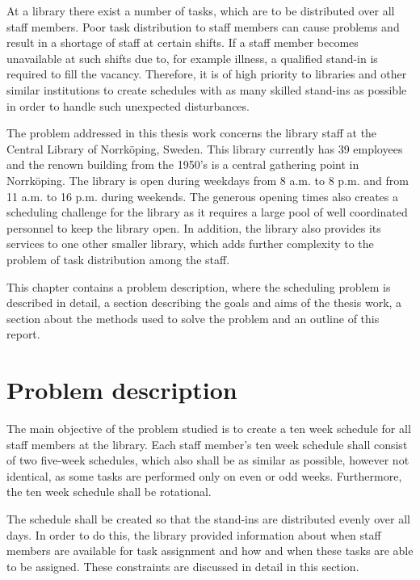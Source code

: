 
At a library there exist a number of tasks, which are to be distributed over all staff members. Poor task distribution to staff members can cause problems and result in a shortage of staff at certain shifts. If a staff member becomes unavailable at such shifts due to, for example illness, a qualified stand-in is required to fill the vacancy. Therefore, it is of high priority to libraries and other similar institutions to create schedules with as many skilled stand-ins as possible in order to handle such unexpected disturbances. 

The problem addressed in this thesis work concerns the library staff at the Central Library of Norrköping, Sweden. This library currently has 39 employees and the renown building from the 1950's is a central gathering point in Norrköping. The library is open during weekdays from 8 a.m. to 8 p.m. and from 11 a.m. to 16 p.m. during weekends. The generous opening times also creates a scheduling challenge for the library as it requires a large pool of well coordinated personnel to keep the library open. In addition, the library also provides its services to one other smaller library, which adds further complexity to the problem of task distribution among the staff.

This chapter contains a problem description, where the scheduling problem is described in detail, a section describing the goals and aims of the thesis work, a section about the methods used to solve the problem and an outline of this report.

\section{Problem description} \label{problem_description}

The main objective of the problem studied is to create a ten week schedule for all staff members at the library. Each staff member's ten week schedule shall consist of two five-week schedules, which also shall be as similar as possible, however not identical, as some tasks are performed only on even or odd weeks. Furthermore, the ten week schedule shall be rotational.

The schedule shall be created so that the stand-ins are distributed evenly over all days. In order to do this, the library provided information about when staff members are available for task assignment and how and when these tasks are able to be assigned. These constraints are discussed in detail in this section.

